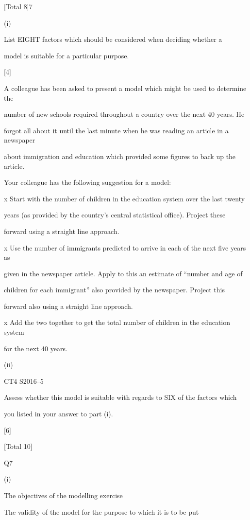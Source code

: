 \documentclass[a4paper,12pt]{article}
\begin{document}
[Total 8]7

(i)

List EIGHT factors which should be considered when deciding whether a

model is suitable for a particular purpose.

[4]

A colleague has been asked to present a model which might be used to determine the

number of new schools required throughout a country over the next 40 years. He

forgot all about it until the last minute when he was reading an article in a newspaper

about immigration and education which provided some figures to back up the article.

Your colleague has the following suggestion for a model:

x Start with the number of children in the education system over the last twenty

years (as provided by the country’s central statistical office). Project these

forward using a straight line approach.

x Use the number of immigrants predicted to arrive in each of the next five years as

given in the newspaper article. Apply to this an estimate of “number and age of

children for each immigrant” also provided by the newspaper. Project this

forward also using a straight line approach.

x Add the two together to get the total number of children in the education system

for the next 40 years.

(ii)

CT4 S2016–5

Assess whether this model is suitable with regards to SIX of the factors which

you listed in your answer to part (i).

[6]

[Total 10]


Q7

(i)

The objectives of the modelling exercise 

The validity of the model for the purpose to which it is to be put 
\end{document}
